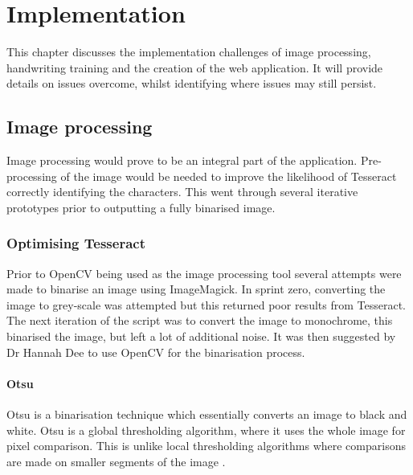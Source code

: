 \chapter{Implementation}



This chapter discusses the implementation challenges of image processing, handwriting training and the creation of the web application. It will provide details on issues overcome, whilst identifying where issues may still persist.
\section{Image processing} \label{imp:image_proces}
Image processing would prove to be an integral part of the application. Pre-processing of the image would be needed to improve the likelihood of Tesseract correctly identifying the characters. This went through several iterative prototypes prior to outputting a fully binarised image.
\subsection{Optimising Tesseract}
Prior to OpenCV being used as the image processing tool several attempts were made to binarise an image using ImageMagick. In sprint zero, converting the image to grey-scale was attempted but this returned poor results from Tesseract. The next iteration of the script was to convert the image to monochrome, this binarised the image, but left a lot of additional noise. It was then suggested by Dr Hannah Dee to use OpenCV for the binarisation process.

\subsubsection{Otsu}
Otsu \cite{citeulike:2917492} is a binarisation technique which essentially converts an image to black and white. Otsu is a global thresholding algorithm, where it uses the whole image for pixel comparison. This is unlike local thresholding algorithms where comparisons are made on smaller segments of the image \cite{citeulike:6044081}.

